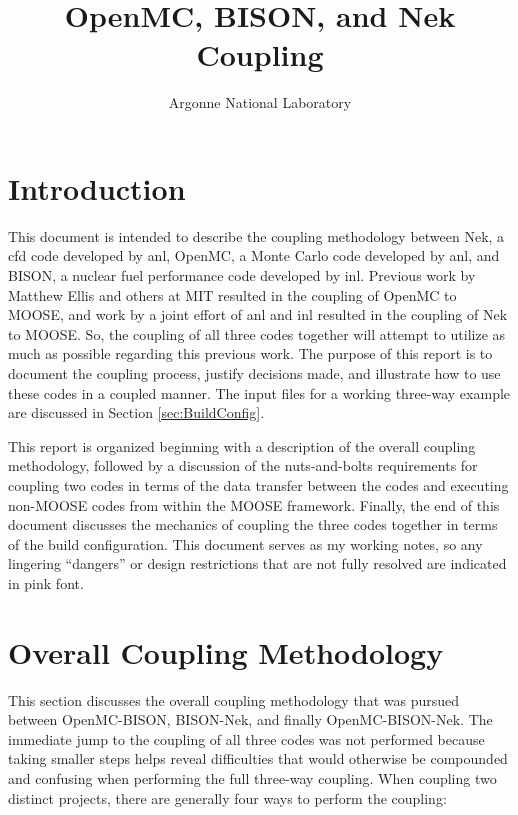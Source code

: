 \documentclass[10pt]{article}
\numberwithin{equation}{section} %
\begin{document}
\title{OpenMC, BISON, and Nek Coupling}
\author{Argonne National Laboratory}
\maketitle

\tableofcontents

\clearpage

\section{Introduction}

This document is intended to describe the coupling methodology between Nek, a \gls{cfd} code developed by \gls{anl}, OpenMC, a Monte Carlo code developed by \gls{anl}, and BISON, a nuclear fuel performance code developed by \gls{inl}. Previous work by Matthew Ellis and others at MIT resulted in the coupling of OpenMC to MOOSE, and work by a joint effort of \gls{anl} and \gls{inl} resulted in the coupling of Nek to MOOSE. So, the coupling of all three codes together will attempt to utilize as much as possible regarding this previous work. The purpose of this report is to document the coupling process, justify decisions made, and illustrate how to use these codes in a coupled manner. The input files for a working three-way example are discussed in Section \ref{sec:BuildConfig}.

This report is organized beginning with a description of the overall coupling methodology, followed by a discussion of the nuts-and-bolts requirements for coupling two codes in terms of the data transfer between the codes and executing non-MOOSE codes from within the MOOSE framework. Finally, the end of this document discusses the mechanics of coupling the three codes together in terms of the build configuration. This document serves as my working notes, so any lingering ``dangers'' or design restrictions that are not fully resolved are indicated in pink font.

\clearpage
\section{Overall Coupling Methodology}
This section discusses the overall coupling methodology that was pursued between OpenMC-BISON, BISON-Nek, and finally OpenMC-BISON-Nek. The immediate jump to the coupling of all three codes was not performed because taking smaller steps helps reveal difficulties that would otherwise be compounded and confusing when performing the full three-way coupling. When coupling two distinct projects, there are generally four ways to perform the coupling:
\end{document}

